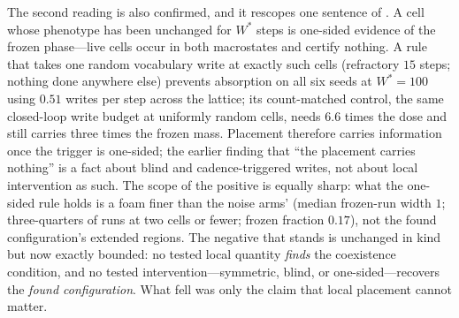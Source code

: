 The second reading is also confirmed, and it rescopes one sentence of
. A cell whose phenotype has been unchanged for
$W^{*}$ steps is one-sided evidence of the frozen phase---live cells occur
in both macrostates and certify nothing. A rule that takes one random
vocabulary write at exactly such cells (refractory $15$ steps; nothing done
anywhere else) prevents absorption on all six seeds at $W^{*} = 100$ using
$0.51$ writes per step across the lattice; its count-matched control, the
same closed-loop write budget at uniformly random cells, needs $6.6$ times
the dose and still carries three times the frozen mass. Placement therefore
carries information once the trigger is one-sided; the earlier finding that
``the placement carries nothing'' is a fact about blind and cadence-triggered
writes, not about local intervention as such. The scope of the positive is
equally sharp: what the one-sided rule holds is a foam finer than the
noise arms' (median frozen-run width $1$; three-quarters of runs at two
cells or fewer; frozen fraction $0.17$), not the found configuration's
extended regions. The negative that stands is unchanged in kind but now
exactly bounded: no tested local quantity \emph{finds} the coexistence
condition, and no tested intervention---symmetric, blind, or
one-sided---recovers the \emph{found configuration}. What fell was only
the claim that local placement cannot matter.
